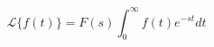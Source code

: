     \begin{center}
        \begin{equation*}
            \mathcal{L} \lbrace f(t) \rbrace =
            F(s) \int_{0}^{\infty} f(t) e^{-st} dt
        \end{equation*}
    \end{center}
